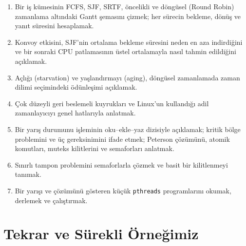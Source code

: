 \vspace{0.8em}
\begin{keyidea}
\begin{enumerate}[leftmargin=1.4em]
  \item Bir iş kümesinin FCFS, SJF, SRTF, öncelikli ve döngüsel (Round Robin) zamanlama altındaki Gantt şemasını çizmek; her sürecin bekleme, dönüş ve yanıt süresini hesaplamak.
  \item Konvoy etkisini, SJF'nin ortalama bekleme süresini neden en aza indirdiğini ve bir sonraki CPU patlamasının üstel ortalamayla nasıl tahmin edildiğini açıklamak.
  \item Açlığı (starvation) ve yaşlandırmayı (aging), döngüsel zamanlamada zaman dilimi seçimindeki ödünleşimi açıklamak.
  \item Çok düzeyli geri beslemeli kuyrukları ve Linux'un kullandığı adil zamanlayıcıyı genel hatlarıyla anlatmak.
  \item Bir yarış durumunu  işleminin oku--ekle--yaz dizisiyle açıklamak; kritik bölge problemini ve üç gereksinimini ifade etmek; Peterson çözümünü, atomik komutları, muteks kilitlerini ve semaforları anlatmak.
  \item Sınırlı tampon problemini semaforlarla çözmek ve basit bir kilitlenmeyi tanımak.
  \item Bir yarışı ve çözümünü gösteren küçük \texttt{pthreads} programlarını okumak, derlemek ve çalıştırmak.
\end{enumerate}
\end{keyidea}

\setcounter{tocdepth}{1}
\tableofcontents

\section{Tekrar ve Sürekli Örneğimiz}

